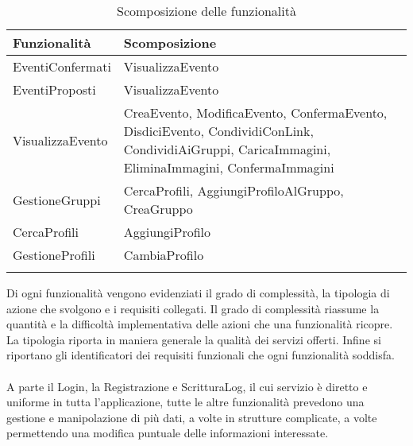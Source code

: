 \begin{longtable} {|P{7.3cm}|P{8cm}|}
    \hline
    \textbf{Funzionalità} & \textbf{Scomposizione}                                                                                                                            \\
    \hline
    \endhead
    EventiConfermati      & VisualizzaEvento                                                                                                                                  \\
    \hline
    EventiProposti        & VisualizzaEvento                                                                                                                                  \\
    \hline
    VisualizzaEvento      & CreaEvento, ModificaEvento, ConfermaEvento, DisdiciEvento, CondividiConLink, CondividiAiGruppi, CaricaImmagini, EliminaImmagini, ConfermaImmagini \\
    \hline
    GestioneGruppi        & CercaProfili, AggiungiProfiloAlGruppo, CreaGruppo                                                                                                 \\
    \hline
    CercaProfili          & AggiungiProfilo                                                                                                                                   \\
    \hline
    GestioneProfili       & CambiaProfilo                                                                                                                                     \\
    \hline
    \caption{Scomposizione delle funzionalità}
\end{longtable}

\clearpage

Di ogni funzionalità vengono evidenziati il grado di complessità,
la tipologia di azione che svolgono e i requisiti collegati.
Il grado di complessità riassume la quantità e la difficoltà implementativa
delle azioni che una funzionalità ricopre.
La tipologia riporta in maniera generale la qualità dei servizi offerti.
Infine si riportano gli identificatori dei requisiti funzionali che ogni funzionalità soddisfa.\\
\\
A parte il Login, la Registrazione e  ScritturaLog,
il cui servizio è diretto e uniforme in tutta l'applicazione,
tutte le altre funzionalità prevedono una gestione e manipolazione di più dati,
a volte in strutture complicate,
a volte permettendo una modifica puntuale delle informazioni interessate.


